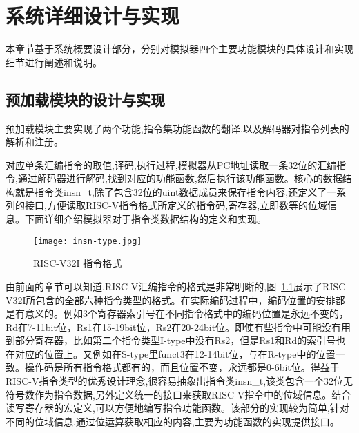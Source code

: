 
\chapter{系统详细设计与实现}

本章节基于系统概要设计部分，分别对模拟器四个主要功能模块的具体设计和实现细节进行阐述和说明。

\section{预加载模块的设计与实现}

预加载模块主要实现了两个功能,指令集功能函数的翻译,以及解码器对指令列表的解析和注册。

对应单条汇编指令的取值,译码,执行过程,模拟器从PC地址读取一条32位的汇编指令,通过解码器进行解码,找到对应的功能函数,然后执行该功能函数。核心的数据结构就是指令类insn\_t,除了包含32位的uint数据成员来保存指令内容,还定义了一系列的接口,方便读取RISC-V指令格式所定义的指令码,寄存器,立即数等的位域信息。下面详细介绍模拟器对于指令类数据结构的定义和实现。
\begin{figure}[h]
    \centering
    \texttt{[image: insn-type.jpg]}
    \caption{RISC-V32I 指令格式}
    \label{fig:insn-type}
\end{figure}


由前面的章节可以知道,RISC-V汇编指令的格式是非常明晰的,图~\ref{fig:insn-type}展示了RISC-V32I所包含的全部六种指令类型的格式。在实际编码过程中，编码位置的安排都是有意义的。例如3个寄存器索引号在不同指令格式中的编码位置是永远不变的，Rd在7-11bit位，Rs1在15-19bit位，Rs2在20-24bit位。即使有些指令中可能没有用到部分寄存器，比如第二个指令类型I-type中没有Rs2，但是Rs1和Rd的索引号也在对应的位置上。又例如在S-type里funct3在12-14bit位，与在R-type中的位置一致。操作码是所有指令格式都有的，而且位置不变，永远都是0-6bit位。得益于RISC-V指令类型的优秀设计理念,很容易抽象出指令类insn\_t,该类包含一个32位无符号数作为指令数据,另外定义统一的接口来获取RISC-V指令中的位域信息。结合读写寄存器的宏定义,可以方便地编写指令功能函数。该部分的实现较为简单,针对不同的位域信息,通过位运算获取相应的内容,主要为功能函数的实现提供接口。


